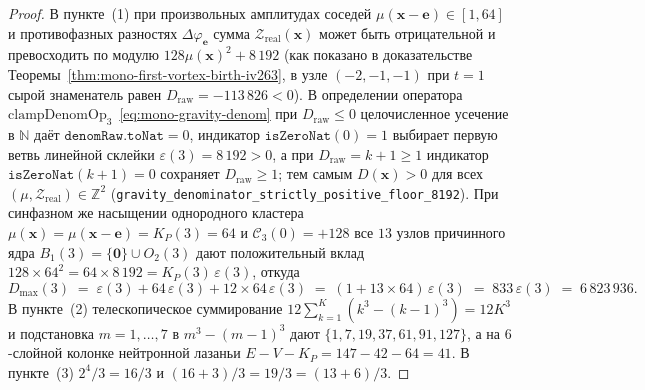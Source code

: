 \begin{proof}
В пункте~(1) при произвольных амплитудах соседей $\mu(\mathbf{x}-\mathbf{e}) \in [1, 64]$ и противофазных разностях $\Delta\varphi_{\mathbf{e}}$ сумма $\mathcal{Z}_{\mathrm{real}}(\mathbf{x})$ может быть отрицательной и превосходить по модулю $128\mu(\mathbf{x})^2 + 8\,192$ (как показано в доказательстве Теоремы~\ref{thm:mono-first-vortex-birth-iv263}, в узле $(-2,-1,-1)$ при $t=1$ сырой знаменатель равен $D_{\mathrm{raw}} = -113\,826 < 0$). В определении оператора $\mathrm{clampDenomOp}_3$~\eqref{eq:mono-gravity-denom} при $D_{\mathrm{raw}} \le 0$ целочисленное усечение в $\mathbb{N}$ даёт $\texttt{denomRaw.toNat} = 0$, индикатор $\texttt{isZeroNat}(0) = 1$ выбирает первую ветвь линейной склейки $\varepsilon(3) = 8\,192 > 0$, а при $D_{\mathrm{raw}} = k + 1 \ge 1$ индикатор $\texttt{isZeroNat}(k+1) = 0$ сохраняет $D_{\mathrm{raw}} \ge 1$; тем самым $D(\mathbf{x}) > 0$ для всех $(\mu, \mathcal{Z}_{\mathrm{real}}) \in \mathbb{Z}^2$ (\texttt{gravity\_denominator\_strictly\_positive\_floor\_8192}). При синфазном же насыщении однородного кластера $\mu(\mathbf{x}) = \mu(\mathbf{x}-\mathbf{e}) = K_P(3) = 64$ и $\mathcal{C}_3(0) = +128$ все $13$ узлов причинного ядра $B_1(3) = \{\mathbf{0}\}\cup O_2(3)$ дают положительный вклад $128 \times 64^2 = 64 \times 8\,192 = K_P(3)\,\varepsilon(3)$, откуда
\[
  D_{\max}(3) \;=\; \varepsilon(3) + 64\,\varepsilon(3) + 12 \times 64\,\varepsilon(3) \;=\; (1 + 13 \times 64)\,\varepsilon(3) \;=\; 833\,\varepsilon(3) \;=\; 6\,823\,936.
\]
В пункте~(2) телескопическое суммирование $12\sum_{k=1}^K(k^3 - (k-1)^3) = 12 K^3$ и подстановка $m = 1,\dots,7$ в $m^3 - (m-1)^3$ дают $\{1, 7, 19, 37, 61, 91, 127\}$, а на $6$-слойной колонке нейтронной лазаньи $E - V - K_P = 147 - 42 - 64 = 41$. В пункте~(3) $2^4 / 3 = 16/3$ и $(16 + 3)/3 = 19/3 = (13 + 6)/3$.
\end{proof}

